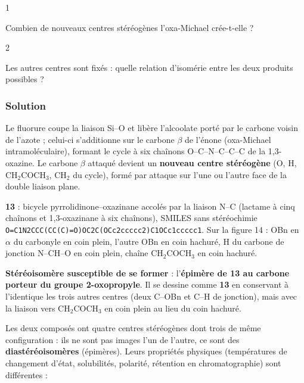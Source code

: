 \documentclass[11pt,a4paper]{article}
\begin{document}
\begin{indication}{1}

Combien de nouveaux centres stéréogènes l'oxa-Michael crée-t-elle ?

\end{indication}

\begin{indication}{2}

Les autres centres sont fixés : quelle relation d'isomérie entre les deux produits possibles ?

\end{indication}

\hypertarget{solution-49}{%
\subsubsection{Solution}\label{solution-49}}

Le fluorure coupe la liaison Si--O et libère l'alcoolate porté par le carbone voisin de l'azote ; celui-ci s'additionne sur le carbone \(\beta\) de l'énone (oxa-Michael intramoléculaire), formant le cycle à six chaînons O--C--N--C--C--C de la 1,3-oxazine. Le carbone \(\beta\) attaqué devient un \textbf{nouveau centre stéréogène} (O, H, \(\mathrm{CH_2COCH_3}\), \(\mathrm{CH_2}\) du cycle), formé par attaque sur l'une ou l'autre face de la double liaison plane.

\textbf{13} : bicycle pyrrolidinone--oxazinane accolés par la liaison N--C (lactame à cinq chaînons et 1,3-oxazinane à six chaînons), SMILES sans stéréochimie \texttt{O=\allowbreak{}C1N2CCC(\allowbreak{}CC(\allowbreak{}C)\allowbreak{}=\allowbreak{}O)\allowbreak{}OC2C(\allowbreak{}OCc2ccccc2)\allowbreak{}C1OCc1ccccc1}. Sur la figure 14 : OBn en \(\alpha\) du carbonyle en coin plein, l'autre OBn en coin hachuré, H du carbone de jonction N--CH--O en coin plein, chaîne \(\mathrm{CH_2COCH_3}\) en coin hachuré.

\textbf{Stéréoisomère susceptible de se former} : l'\textbf{épimère de 13 au carbone porteur du groupe 2-oxopropyle}. Il se dessine comme \textbf{13} en conservant à l'identique les trois autres centres (deux C--OBn et C--H de jonction), mais avec la liaison vers \(\mathrm{CH_2COCH_3}\) en coin plein au lieu du coin hachuré.

Les deux composés ont quatre centres stéréogènes dont trois de même configuration : ils ne sont pas images l'un de l'autre, ce sont des \textbf{diastéréoisomères} (épimères). Leurs propriétés physiques (températures de changement d'état, solubilités, polarité, rétention en chromatographie) sont différentes :
\end{document}
